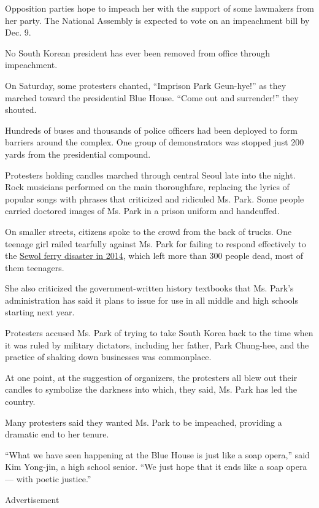 Opposition parties hope to impeach her with the support of some
lawmakers from her party. The National Assembly is expected to vote on
an impeachment bill by Dec. 9.

No South Korean president has ever been removed from office through
impeachment.

On Saturday, some protesters chanted, ``Imprison Park Geun-hye!'' as
they marched toward the presidential Blue House. ``Come out and
surrender!'' they shouted.

Hundreds of buses and thousands of police officers had been deployed to
form barriers around the complex. One group of demonstrators was stopped
just 200 yards from the presidential compound.

Protesters holding candles marched through central Seoul late into the
night. Rock musicians performed on the main thoroughfare, replacing the
lyrics of popular songs with phrases that criticized and ridiculed Ms.
Park. Some people carried doctored images of Ms. Park in a prison
uniform and handcuffed.

On smaller streets, citizens spoke to the crowd from the back of trucks.
One teenage girl railed tearfully against Ms. Park for failing to
respond effectively to the
\href{http://www.nytimes3xbfgragh.onion/interactive/2015/04/12/world/asia/12ferry-timeline.html?_r=0\#/\#time367_10822}{Sewol
ferry disaster in 2014}, which left more than 300 people dead, most of
them teenagers.

She also criticized the government-written history textbooks that Ms.
Park's administration has said it plans to issue for use in all middle
and high schools starting next year.

Protesters accused Ms. Park of trying to take South Korea back to the
time when it was ruled by military dictators, including her father, Park
Chung-hee, and the practice of shaking down businesses was commonplace.

At one point, at the suggestion of organizers, the protesters all blew
out their candles to symbolize the darkness into which, they said, Ms.
Park has led the country.

Many protesters said they wanted Ms. Park to be impeached, providing a
dramatic end to her tenure.

``What we have seen happening at the Blue House is just like a soap
opera,'' said Kim Yong-jin, a high school senior. ``We just hope that it
ends like a soap opera --- with poetic justice.''

Advertisement

